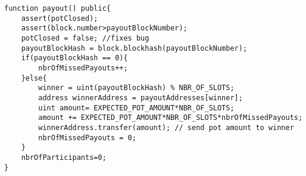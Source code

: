 \begin{lstlisting}[basicstyle=\small]
function payout() public{
    assert(potClosed);
    assert(block.number>payoutBlockNumber);
    potClosed = false; //fixes bug
    payoutBlockHash = block.blockhash(payoutBlockNumber); 
    if(payoutBlockHash == 0){
        nbrOfMissedPayouts++;
    }else{
        winner = uint(payoutBlockHash) % NBR_OF_SLOTS;
        address winnerAddress = payoutAddresses[winner];
        uint amount= EXPECTED_POT_AMOUNT*NBR_OF_SLOTS;
        amount += EXPECTED_POT_AMOUNT*NBR_OF_SLOTS*nbrOfMissedPayouts;
        winnerAddress.transfer(amount); // send pot amount to winner
        nbrOfMissedPayouts = 0;
    }
    nbrOfParticipants=0;
}
\end{lstlisting}

